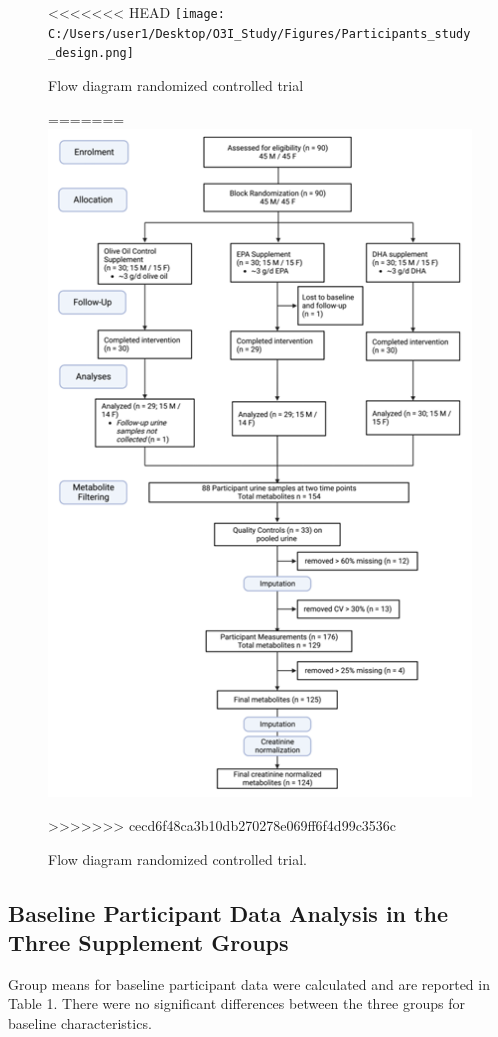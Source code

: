 \documentclass[journal=jacsat,manuscript=article]{achemso}
\begin{document}
\begin{figure}
<<<<<<< HEAD
\centering
\texttt{[image: C:/Users/user1/Desktop/O3I\_Study/Figures/Participants\_study\_design.png]}
\caption{Flow diagram randomized controlled trial}\label{fig:fig1}
=======
\includegraphics[width=0.8\linewidth]{../Figures/Participants_study_design} \caption{Flow diagram randomized controlled trial.}\label{fig:unnamed-chunk-1}
>>>>>>> cecd6f48ca3b10db270278e069ff6f4d99c3536c
\end{figure}

\subsection{Baseline Participant Data Analysis in the Three Supplement
Groups}\label{baseline-participant-data-analysis-in-the-three-supplement-groups}

Group means for baseline participant data were calculated and are
reported in Table 1. There were no significant differences between the
three groups for baseline characteristics.
\end{document}
